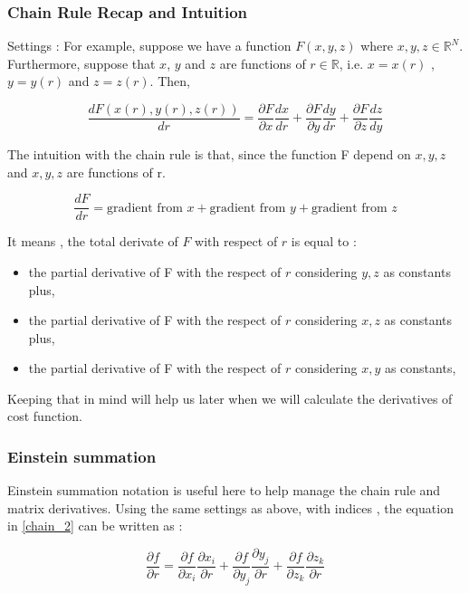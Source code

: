 \documentclass[11pt,twoside]{article}
\begin{document}
\subsubsection{Chain Rule Recap and Intuition}
Settings : 
For example, suppose we have a function $F(x,y,z)$ where $x,y, z\in \mathbb{R}^N$. Furthermore, suppose that $x$, $y$ and $z$ are functions of $r\in\mathbb{R}$, i.e. $x=x(r)$ , $y=y(r)$ and $z=z(r)$. Then,

\begin{equation}
    \label{chain_2}
    \frac{dF(x(r), y(r), z(r))}{dr} = \frac{\partial F}{\partial x}\frac{dx}{dr} + \frac{\partial F}{\partial y}\frac{dy}{dr} + \frac{\partial F}{\partial z}\frac{dz}{dy}
\end{equation}

The intuition with the chain rule is that, since the function F depend on $x, y, z$ and $x, y, z $ are functions of r.

\begin{equation}
    \label{chain_explanation}
    \frac{dF}{dr} = \text{gradient from } x + \text{gradient from } y + \text{gradient from } z
\end{equation}

It means , the total derivate of $F$ with respect of $r$  is equal to : 

\begin{itemize}
    \item the partial derivative of F with the respect of $r$ considering $y, z$ as constants plus,
    
    \item the partial derivative of F with the respect of $r$ considering $x, z$ as constants plus, 
    
     \item the partial derivative of F with the respect of $r$ considering $x, y$ as constants, 
\end{itemize}

Keeping that in mind will help us later when we will calculate the derivatives of  cost  function.

\subsubsection{Einstein summation}
Einstein summation notation is useful here to help manage the chain rule and matrix derivatives. Using the same settings as above, with indices , the equation in \eqref{chain_2} can be written as : 

\begin{equation}
\label{chain}
\frac{\partial f}{\partial r}=\frac{\partial f}{\partial x_i}\frac{\partial x_i}{\partial r}+\frac{\partial f}{\partial y_j}\frac{\partial y_j}{\partial r}+\frac{\partial f}{\partial z_k}\frac{\partial z_k}{\partial r}
\end{equation}
\end{document}
